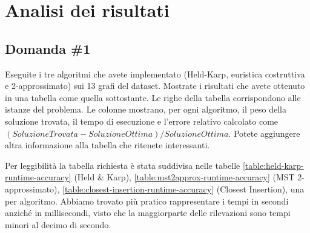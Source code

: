 \section{Analisi dei risultati}
\label{cap:performance-analysis}

\subsection{Domanda \#1}
\label{sec:question-1}

\begin{displayquote}
Eseguite i tre algoritmi che avete implementato (Held-Karp,
euristica costruttiva e 2-approssimato) sui 13 grafi del dataset.
Mostrate i risultati che avete ottenuto in una tabella come quella
sottostante. Le righe della tabella corrispondono alle istanze del
problema. Le colonne mostrano, per ogni algoritmo, il peso della
soluzione trovata, il tempo di esecuzione e l'errore relativo
calcolato come $(SoluzioneTrovata-SoluzioneOttima)/SoluzioneOttima$.
Potete aggiungere altra informazione alla tabella che ritenete
interessanti.
\end{displayquote}

\noindent Per leggibilità la tabella richiesta è stata suddivisa nelle
tabelle
\ref{table:held-karp-runtime-accuracy} (Held \& Karp),
\ref{table:mst2approx-runtime-accuracy} (MST 2-approssimato),
\ref{table:closest-insertion-runtime-accuracy} (Closest Insertion),
una per algoritmo. Abbiamo trovato più pratico rappresentare i tempi in secondi anziché in millisecondi, visto che la maggiorparte delle rilevazioni sono tempi minori al decimo di secondo.

